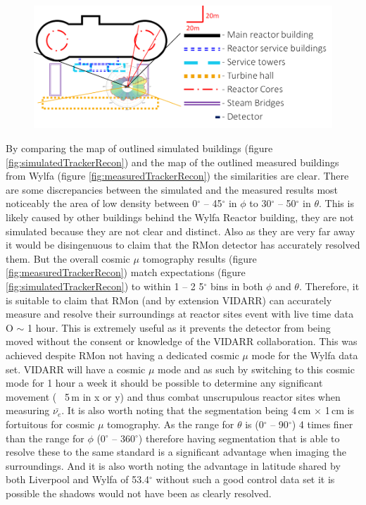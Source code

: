 \begin{figure}[!h]
 \centering
 \includegraphics[width=\linewidth]{Chapter5/Figs/wylfaRasterNew/wylfaCircular0-37.5Deg_Overlay_Updated.png}
 \label{fig:wylfaCircular0-37.5Deg_Overlay_Updated}
\end{figure}

By comparing the map of outlined simulated buildings (figure \ref{fig:simulatedTrackerRecon}) and the map of the outlined measured buildings from Wylfa (figure \ref{fig:measuredTrackerRecon}) the similarities are clear. There are some discrepancies between the simulated and the measured results most noticeably the area of low density between 0$^\circ$ -- 45$^\circ$ in $\phi$ to 30$^\circ$ -- 50$^\circ$ in $\theta$. This is likely caused by other buildings behind the Wylfa Reactor building, they are not simulated because they are not clear and distinct. Also as they are very far away it would be disingenuous to claim that the RMon detector has accurately resolved them. But the overall cosmic $\mu$ tomography results (figure \ref{fig:measuredTrackerRecon}) match expectations (figure \ref{fig:simulatedTrackerRecon}) to within 1 -- 2 5$^\circ$ bins in both $\phi$ and $\theta$. Therefore, it is suitable to claim that RMon (and by extension VIDARR) can accurately measure and resolve their surroundings at reactor sites event with live time data O $\sim$ 1 hour. This is extremely useful as it prevents the detector from being moved without the consent or knowledge of the VIDARR collaboration. This was achieved despite RMon not having a dedicated cosmic $\mu$ mode for the Wylfa data set. VIDARR will have a cosmic $\mu$ mode and as such by switching to this cosmic mode for 1 hour a week it should be possible to determine any significant movement (~ 5\,m in x or y) and thus combat unscrupulous reactor sites when measuring $\bar{\nu_e}$. It is also worth noting that the segmentation being 4\,cm $\times$ 1\,cm is fortuitous for cosmic $\mu$ tomography. As the range for $\theta$ is (0$^\circ$ -- 90$^\circ$) 4 times finer than the range for $\phi$ (0$^\circ$ -- 360$^\circ$) therefore having segmentation that is able to resolve these to the same standard is a significant advantage when imaging the surroundings. And it is also worth noting the advantage in latitude shared by both Liverpool and Wylfa of 53.4$^\circ$ without such a good control data set it is possible the shadows would not have been as clearly resolved. 

